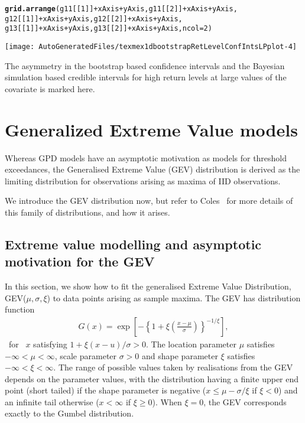 \documentclass[10pt]{article}\usepackage[]{graphicx}\usepackage[]{color}
\makeatletter
\def\maxwidth{ %
  \ifdim\Gin@nat@width>\linewidth
    \linewidth
  \else
    \Gin@nat@width
  \fi
}
\newcommand{\hlnum}[1]{\textcolor[rgb]{0.686,0.059,0.569}{#1}}%
\newcommand{\hlopt}[1]{\textcolor[rgb]{0,0,0}{#1}}%
\newcommand{\hlstd}[1]{\textcolor[rgb]{0.345,0.345,0.345}{#1}}%
\newcommand{\hlkwc}[1]{\textcolor[rgb]{0.333,0.667,0.333}{#1}}%
\newcommand{\hlkwd}[1]{\textcolor[rgb]{0.737,0.353,0.396}{\textbf{#1}}}%
\newenvironment{kframe}{%
 \def\at@end@of@kframe{}%
 \ifinner\ifhmode%
  \def\at@end@of@kframe{\end{minipage}}%
  \begin{minipage}{\columnwidth}%
 \fi\fi%
 \def\FrameCommand##1{\hskip\@totalleftmargin \hskip-\fboxsep
 \colorbox{shadecolor}{##1}\hskip-\fboxsep
     \hskip-\linewidth \hskip-\@totalleftmargin \hskip\columnwidth}%
 \MakeFramed {\advance\hsize-\width
   \@totalleftmargin\z@ \linewidth\hsize
   \@setminipage}}%
 {\par\unskip\endMakeFramed%
 \at@end@of@kframe}
\newenvironment{knitrout}{}{} %
\makeatother
\begin{document}
\begin{knitrout}
\begin{kframe}
\begin{alltt}
\hlkwd{grid.arrange}\hlstd{(g11[[}\hlnum{1}\hlstd{]]} \hlopt{+} \hlstd{xAxis}\hlopt{+}\hlstd{yAxis,g11[[}\hlnum{2}\hlstd{]]} \hlopt{+} \hlstd{xAxis}\hlopt{+}\hlstd{yAxis,}
             \hlstd{g12[[}\hlnum{1}\hlstd{]]} \hlopt{+} \hlstd{xAxis}\hlopt{+}\hlstd{yAxis,g12[[}\hlnum{2}\hlstd{]]} \hlopt{+} \hlstd{xAxis}\hlopt{+}\hlstd{yAxis,}
             \hlstd{g13[[}\hlnum{1}\hlstd{]]} \hlopt{+} \hlstd{xAxis}\hlopt{+}\hlstd{yAxis,g13[[}\hlnum{2}\hlstd{]]} \hlopt{+} \hlstd{xAxis}\hlopt{+}\hlstd{yAxis,}\hlkwc{ncol}\hlstd{=}\hlnum{2}\hlstd{)}
\end{alltt}
\end{kframe}
\texttt{[image: AutoGeneratedFiles/texmex1dbootstrapRetLevelConfIntsLPplot-4]} 

\end{knitrout}
The asymmetry in the bootstrap based confidence intervals and the Bayesian simulation based credible intervals for high return levels at large values of the covariate is marked here.
%
\section{Generalized Extreme Value models}
%
Whereas GPD models have an asymptotic motivation as models for threshold exceedances, the Generalised Extreme Value (GEV) distribution is derived as the limiting distribution for observations arising as maxima of IID observations.

We introduce the GEV distribution now, but refer to Coles~\cite{coles} for more details of this family of distributions, and how it arises.
%
\subsection{Extreme value modelling and asymptotic motivation for the GEV}
%
In this section, we show how to fit the generalised Extreme Value  Distribution,
GEV($\mu, \sigma, \xi$) to
data points arising as sample maxima.
The GEV has distribution function
\begin{eqnarray}
\label{eqn:GEVDistnFun}
G(x)=\exp\left[-\left\{1+\xi\left(\frac{x-\mu}{\sigma}\right)\right\}^{-1/\xi}\right],
\end{eqnarray}
\mbox{ for } $x$ satisfying $1+\xi(x-u)/\sigma>0$.  The location parameter $\mu$ satisfies $-\infty <\mu<\infty$, scale parameter $\sigma>0$ and shape parameter $\xi$ satisfies $-\infty <\xi<\infty$.  The range of possible values taken
by realisations from the GEV depends on the parameter values, with the
distribution having a finite upper end point (short tailed) if the
shape parameter is negative ($x\leq \mu-\sigma/\xi$ if $\xi<0$) and an
infinite tail otherwise ($x<\infty$ if $\xi\geq 0$).  When $\xi=0$, the GEV corresponds exactly to the Gumbel distribution.
\end{document}
